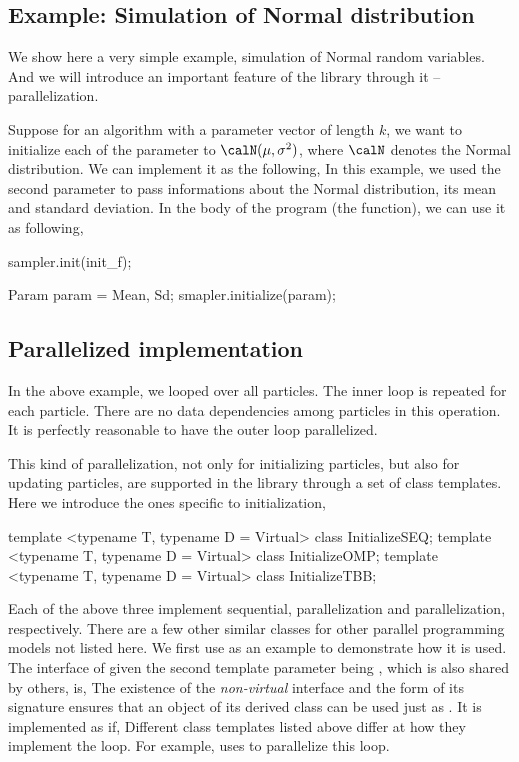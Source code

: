 \subsection{Example: Simulation of Normal distribution}
\label{sub:Example: Simulation of Normal distribution}

We show here a very simple example, simulation of Normal random variables.
And we will introduce an important feature of the library through it --
parallelization.

Suppose for an \smc algorithm with a parameter vector of length $k$, we want to
initialize each of the parameter to $\calN(\mu,\sigma^2)$, where $\calN$
denotes the Normal distribution. We can implement it as the following,
In this example, we used the second parameter  to pass
informations about the Normal distribution, its mean and standard deviation.
In the body of the program (the  function), we can use it as
following,
\begin{cppcode}
sampler.init(init_f);

Param param = {Mean, Sd};
smapler.initialize(param);
\end{cppcode}

\subsection{Parallelized implementation}
\label{sub:Parallelized implementation}

In the above example, we looped over all particles. The inner loop is repeated
for each particle. There are no data dependencies among particles in this
operation. It is perfectly reasonable to have the outer loop parallelized.

This kind of parallelization, not only for initializing particles, but also
for updating particles, are supported in the \vsmc library through a set of
class templates. Here we introduce the ones specific to initialization,
\begin{cppcode}
template <typename T, typename D = Virtual> class InitializeSEQ;
template <typename T, typename D = Virtual> class InitializeOMP;
template <typename T, typename D = Virtual> class InitializeTBB;
\end{cppcode}
Each of the above three implement sequential, \openmp parallelization and \tbb
parallelization, respectively. There are a few other similar classes for other
parallel programming models not listed here. We first use
 as an example to demonstrate how it is used. The
interface of  given the second template parameter
being , which is also shared by others, is,
The existence of the \emph{non-virtual} interface  and
the form of its signature ensures that an object of its derived class can be
used just as . It is implemented as if,
Different class templates listed above differ at how they implement the loop.
For example,  uses \openmp to parallelize this loop.

